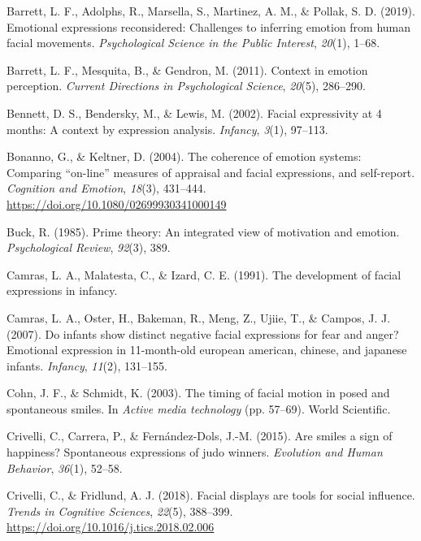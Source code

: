 \documentclass[man]{apa6}
\begin{document}
\leavevmode\hypertarget{ref-barrett2019emotional}{}%
Barrett, L. F., Adolphs, R., Marsella, S., Martinez, A. M., \& Pollak, S. D. (2019). Emotional expressions reconsidered: Challenges to inferring emotion from human facial movements. \emph{Psychological Science in the Public Interest}, \emph{20}(1), 1--68.

\leavevmode\hypertarget{ref-barrett2011context}{}%
Barrett, L. F., Mesquita, B., \& Gendron, M. (2011). Context in emotion perception. \emph{Current Directions in Psychological Science}, \emph{20}(5), 286--290.

\leavevmode\hypertarget{ref-bennett2002facial}{}%
Bennett, D. S., Bendersky, M., \& Lewis, M. (2002). Facial expressivity at 4 months: A context by expression analysis. \emph{Infancy}, \emph{3}(1), 97--113.

\leavevmode\hypertarget{ref-bonanno2004brief}{}%
Bonanno, G., \& Keltner, D. (2004). The coherence of emotion systems: Comparing ``on-line'' measures of appraisal and facial expressions, and self-report. \emph{Cognition and Emotion}, \emph{18}(3), 431--444. \url{https://doi.org/10.1080/02699930341000149}

\leavevmode\hypertarget{ref-buck1985prime}{}%
Buck, R. (1985). Prime theory: An integrated view of motivation and emotion. \emph{Psychological Review}, \emph{92}(3), 389.

\leavevmode\hypertarget{ref-camras1991development}{}%
Camras, L. A., Malatesta, C., \& Izard, C. E. (1991). The development of facial expressions in infancy.

\leavevmode\hypertarget{ref-camras2007infants}{}%
Camras, L. A., Oster, H., Bakeman, R., Meng, Z., Ujiie, T., \& Campos, J. J. (2007). Do infants show distinct negative facial expressions for fear and anger? Emotional expression in 11-month-old european american, chinese, and japanese infants. \emph{Infancy}, \emph{11}(2), 131--155.

\leavevmode\hypertarget{ref-cohn2003timing}{}%
Cohn, J. F., \& Schmidt, K. (2003). The timing of facial motion in posed and spontaneous smiles. In \emph{Active media technology} (pp. 57--69). World Scientific.

\leavevmode\hypertarget{ref-crivelli2015smiles}{}%
Crivelli, C., Carrera, P., \& Fernández-Dols, J.-M. (2015). Are smiles a sign of happiness? Spontaneous expressions of judo winners. \emph{Evolution and Human Behavior}, \emph{36}(1), 52--58.

\leavevmode\hypertarget{ref-crivelli2018facial}{}%
Crivelli, C., \& Fridlund, A. J. (2018). Facial displays are tools for social influence. \emph{Trends in Cognitive Sciences}, \emph{22}(5), 388--399. \url{https://doi.org/10.1016/j.tics.2018.02.006}
\end{document}
